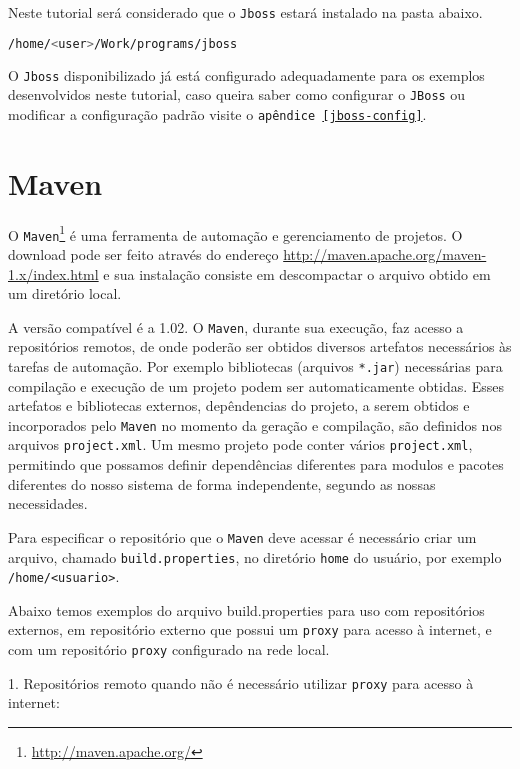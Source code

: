 Neste tutorial será considerado que o \texttt{Jboss} estará instalado na pasta
abaixo.

\begin{lstlisting}[language=bash]
/home/<user>/Work/programs/jboss
\end{lstlisting}

O \texttt{Jboss} disponibilizado já está configurado adequadamente para os
exemplos desenvolvidos neste tutorial, caso queira saber como configurar o
\texttt{JBoss} ou modificar a configuração padrão visite o \texttt{apêndice
\ref{jboss-config}}.

\section{Maven}
O
\texttt{Maven}\footnote{\href{http://maven.apache.org/}{http://maven.apache.org/}}
é uma ferramenta de automação e gerenciamento de projetos. O download pode ser
feito através do endereço
\href{http://maven.apache.org/maven-1.x/index.html}{http://maven.apache.org/maven-1.x/index.html}
e sua instalação consiste em descompactar o arquivo obtido em um diretório
local.

A versão compatível é a 1.02. O \texttt{Maven}, durante sua execução, faz acesso
a repositórios remotos, de onde poderão ser obtidos diversos artefatos
necessários às tarefas de automação. Por exemplo bibliotecas (arquivos
\texttt{*.jar}) necessárias para compilação e execução de um projeto podem ser
automaticamente obtidas. Esses artefatos e bibliotecas externos, depêndencias do
projeto, a serem obtidos e incorporados pelo \texttt{Maven} no momento da
geração e compilação, são definidos nos arquivos \texttt{project.xml}. Um mesmo
projeto pode conter vários \texttt{project.xml}, permitindo que possamos definir
dependências diferentes para modulos e pacotes diferentes do nosso sistema de
forma independente, segundo as nossas necessidades.

Para especificar o repositório que o \texttt{Maven} deve acessar é necessário
criar um arquivo, chamado \texttt{build.properties}, no diretório \texttt{home}
do usuário, por exemplo \texttt{/home/<usuario>}.

Abaixo temos exemplos do arquivo build.properties para uso com repositórios
externos, em repositório externo que possui um \texttt{proxy} para acesso à
internet, e com um repositório \texttt{proxy} configurado na rede local.

1. Repositórios remoto quando não é necessário utilizar \texttt{proxy} para
acesso à internet:

